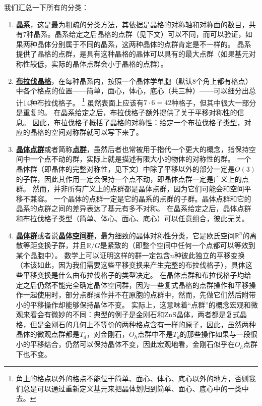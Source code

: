 \documentclass[hyperref, UTF8, a4paper]{ctexart}
\newcommand*{\concept}[1]{\underline{\textbf{#1}}}
\begin{document}
我们汇总一下所有的分类：
\begin{enumerate}
    \item \concept{晶系}，这是最为粗疏的分类方法，其依据是晶格的对称轴和对称面的数目，共有7种晶系。晶系给定之后晶格的点群（见下文）可以不同，而可以验证，如果两种晶体分别属于不同的晶系，这两种晶体的点群肯定是不一样的。
    晶系提供了晶格的点群，是具有这种晶格的晶体可以具有的最大点群（如果基元对称性较低，实际的晶体点群会小于晶格的点群）。
    \item \concept{布拉伐晶格}，在每种晶系内，按照一个晶体学单胞（默认8个角上都有格点）中各个格点的位置——简单，面心，体心，底心（共三种）——可以细分出总计14种布拉伐格子。%
    \footnote{
        角上的格点以外的格点不能位于简单、面心、体心、底心以外的地方，否则我们总是可以通过重新定义基元来把晶体划归到简单、面心、底心中的一类中去。
    }%
    虽然表面上应该有$7 \cdot 6 = 42$种格子，但其中很大一部分是重复的。
    在晶系给定之后，布拉伐格子额外提供了关于平移对称性的信息。
    因此，布拉伐格子概括了晶格的对称性：给定一个布拉伐格子类型，对应的晶格的空间对称群就可以写下来了。
    \item \concept{晶体点群}或者简称\concept{点群}，虽然后者也常被用于指代一个更大的概念，指保持空间中一个点不动的群，实际上就是描述有限大小的物体的对称性的群。
    一个晶体群（即晶体的完整对称性，见下文）中除了平移以外的部分一定是$O(3)$的子群，因此其作用一定会保持一个点不动，即晶体点群一定是广义上的点群。
    然而，并非所有广义上的点群都是晶体点群，因为它们可能会和空间平移不兼容。
    一个晶体的点群一定是它的晶系的点群的子群。晶体点群和它的晶系的点群之间的差异表达了基元有多不对称。
    在晶系给定之后，晶体点群和布拉伐格子类型（简单、体心、面心、底心）可以任意组合，彼此无关。
    \item \concept{晶体群}或者说\concept{晶体空间群}，最为细致的晶体对称性分类，它是欧氏空间$\mathbb{R}^n$的离散等距变换子群，并且$\mathbb{R} / G$是紧致的（即整个空间中任何一个点都可以等效到某个晶胞中）。
    数学上可以证明这样的群一定包含$n$种彼此独立的平移变换（本该如此，因为我们需要这些平移变换来产生完整的布拉伐格子），具体这些平移变换是什么由布拉伐格子的类型决定。
    在晶体点群和布拉伐格子均给定之后仍然不能完全确定晶体空间群，因为一些复式晶格的点群操作和平移操作一起使用时，部分点群操作并不在原胞的点群中，然而，先做它们然后附带小的平移操作却能够保持晶体不变。
    实际上，这意味着“点群”的概念宏观和微观来看会有微妙的不同：典型的例子是金刚石和ZnS晶体，两者都是复式晶格，但是金刚石的几何上不等价的两种格点含有一样的原子，因此，虽然两种晶体的微观点群都是$T_d$，对金刚石，$O_h$点群中不是$T_d$的那些操作如果与一段很小的平移结合，仍然可以保持晶体不变，因此宏观地看，金刚石似乎在$O_h$点群下也不变。
\end{enumerate}
\end{document}
